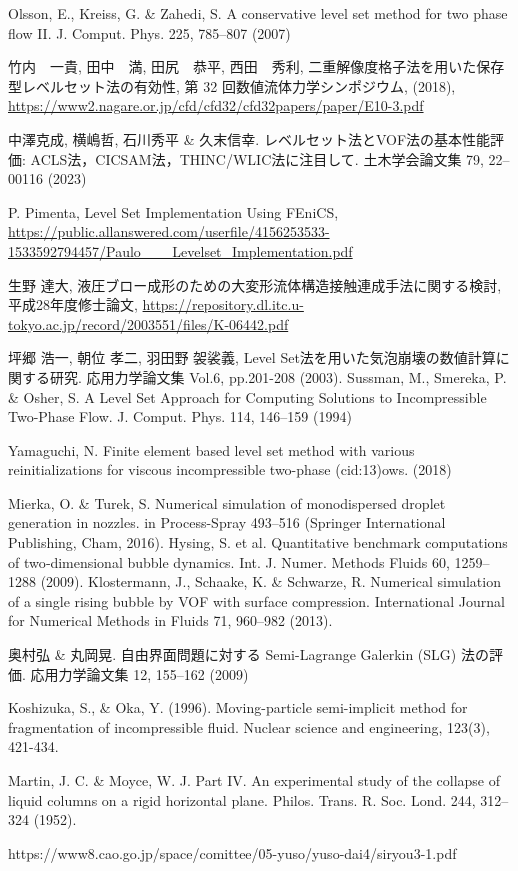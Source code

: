 \documentclass[8pt,a4paper]{article}
\begin{document}
\begin{thebibliography}{99}
	 Olsson, E., Kreiss, G. \& Zahedi, S. A conservative level set method for two phase flow II. J. Comput. Phys. 225, 785–807 (2007)

	 竹内　一貴, 田中　満, 田尻　恭平, 西田　秀利, 二重解像度格子法を用いた保存型レベルセット法の有効性, 第 32 回数値流体力学シンポジウム, (2018), \url{https://www2.nagare.or.jp/cfd/cfd32/cfd32papers/paper/E10-3.pdf}

	 中澤克成, 横嶋哲, 石川秀平 \& 久末信幸. レベルセット法とVOF法の基本性能評価: ACLS法，CICSAM法，THINC/WLIC法に注目して. 土木学会論文集 79, 22–00116 (2023)

	 P. Pimenta, Level Set Implementation Using FEniCS, \url{https://public.allanswered.com/userfile/4156253533-1533592794457/Paulo___Levelset_Implementation.pdf}

	 生野 達大, 液圧ブロー成形のための大変形流体構造接触連成手法に関する検討, 平成28年度修士論文, \url{https://repository.dl.itc.u-tokyo.ac.jp/record/2003551/files/K-06442.pdf}

	 坪郷 浩一, 朝位 孝二, 羽田野 袈裟義, Level Set法を用いた気泡崩壊の数値計算に関する研究. 応用力学論文集 Vol.6, pp.201-208 (2003).
	 Sussman, M., Smereka, P. \& Osher, S. A Level Set Approach for Computing Solutions to Incompressible Two-Phase Flow. J. Comput. Phys. 114, 146–159 (1994)

	 Yamaguchi, N. Finite element based level set method with various reinitializations for viscous incompressible two-phase (cid:13)ows. (2018)

	 Mierka, O. \& Turek, S. Numerical simulation of monodispersed droplet generation in nozzles. in Process-Spray 493–516 (Springer International Publishing, Cham, 2016).
	 Hysing, S. et al. Quantitative benchmark computations of two‐dimensional bubble dynamics. Int. J. Numer. Methods Fluids 60, 1259–1288 (2009).
	 Klostermann, J., Schaake, K. \& Schwarze, R. Numerical simulation of a single rising bubble by VOF with surface compression. International Journal for Numerical Methods in Fluids 71, 960–982 (2013).

	 奥村弘 \& 丸岡晃. 自由界面問題に対する Semi-Lagrange Galerkin (SLG) 法の評価. 応用力学論文集 12, 155–162 (2009)

	 Koshizuka, S., \& Oka, Y. (1996). Moving-particle semi-implicit method for fragmentation of incompressible fluid. Nuclear science and engineering, 123(3), 421-434.

	 Martin, J. C. \& Moyce, W. J. Part IV. An experimental study of the collapse of liquid columns on a rigid horizontal plane. Philos. Trans. R. Soc. Lond. 244, 312–324 (1952).

	 https://www8.cao.go.jp/space/comittee/05-yuso/yuso-dai4/siryou3-1.pdf
\end{thebibliography}
\end{document}
